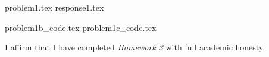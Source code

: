\documentclass[letterpaper, 12pt]{article}
\begin{document}

% 
{problem1.tex}
{response1.tex}

% 


\appendix

{problem1b_code.tex}
{problem1c_code.tex}

\par

I affirm that I have completed \textit{Homework 3} with full academic honesty.
\end{document}

